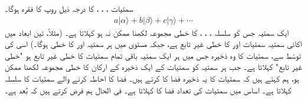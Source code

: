سمتیات ، ، ،   
 کا      درجہ ذیل روپ کا  فقرہ ہوگا۔
\begin{align}
	a|\alpha\rangle+b|\beta\rangle+c|\gamma\rangle+\cdots
\end{align}
ایک سمتیہ  جس کو سلسلہ  ، ، ،  کا      خطی مجموعہ لکھنا ممکن نہ ہو    کہلاتا ہے۔ (مثلاً،  تین ابعاد میں اکائی سمتیہ  سمتیات  اور  کا خطی غیر تابع ہے،  جبکہ  مستوی میں ہر  سمتیہ  اور  کا خطی   ہوگا۔)  اسی کی توسّط   سے، سمتیات کا  وہ  ذخیرہ جس میں ہر ایک سمتیہ  باقی تمام سمتیات  کا خطی غیر تابع ہو  "خطی غیر تابع"  کہلاتا ہے۔ جب ہر سمتیہ کو  سمتیات کے ایک ذخیرہ کے ارکان کا خطی مجموعہ لکھنا ممکن ہو، ہم کہتے ہیں کہ سمتیات کا یہ ذخیرہ  فضا کا    کرتے  ہیں۔ فضا کا احاطہ کرنے والے    سمتیات کا سلسلہ   کہلاتا ہے۔ اساس میں سمتیات کی تعداد  فضا کا    کہلاتا ہے۔ فی الحال ہم فرض کرتے ہیں کہ بُعد    ہے۔

